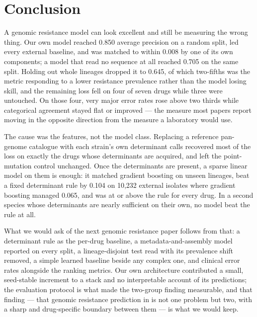 \section*{Conclusion}

A genomic resistance model can look excellent and still be measuring the wrong thing. Our own model
reached 0.850 average precision on a random split, led every external baseline, and was matched to
within 0.008 by one of its own components; a model that read no sequence at all reached 0.705 on the
same split. Holding out whole lineages dropped it to 0.645, of which two-fifths was the metric
responding to a lower resistance prevalence rather than the model losing skill, and the remaining
loss fell on four of seven drugs while three were untouched. On those four, very major error rates
rose above two thirds while categorical agreement stayed flat or improved --- the measure most
papers report moving in the opposite direction from the measure a laboratory would use.

The cause was the features, not the model class. Replacing a reference pan-genome catalogue with
each strain's own determinant calls recovered most of the loss on exactly the drugs whose
determinants are acquired, and left the point-mutation control unchanged. Once the determinants are
present, a sparse linear model on them is enough: it matched gradient boosting on unseen lineages,
beat a fixed determinant rule by 0.104 on 10,232 external isolates where gradient boosting managed
0.065, and was at or above the rule for every drug. In a second species whose determinants are
nearly sufficient on their own, no model beat the rule at all.

What we would ask of the next genomic resistance paper follows from that: a determinant rule as the
per-drug baseline, a metadata-and-assembly model reported on every split, a lineage-disjoint test
read with its prevalence shift removed, a simple learned baseline beside any complex one, and
clinical error rates alongside the ranking metrics. Our own architecture contributed a small,
seed-stable increment to a stack and no interpretable account of its predictions; the evaluation
protocol is what made the two-group finding measurable, and that finding --- that genomic
resistance prediction in \Ecoli{} is not one problem but two, with a sharp and drug-specific
boundary between them --- is what we would keep.

